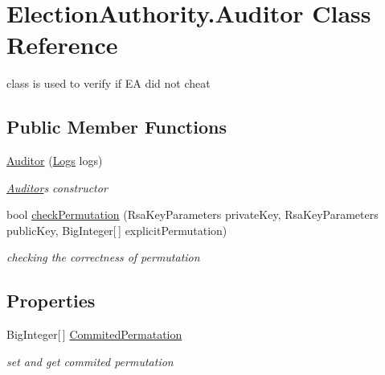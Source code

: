 \hypertarget{class_election_authority_1_1_auditor}{}\section{Election\+Authority.\+Auditor Class Reference}
\label{class_election_authority_1_1_auditor}


class is used to verify if E\+A did not cheat  


\subsection*{Public Member Functions}
\begin{DoxyCompactItemize}
\item 
\hyperlink{class_election_authority_1_1_auditor_ad1edb55058d499d307618a0c5842b12d}{Auditor} (\hyperlink{class_election_authority_1_1_logs}{Logs} logs)
\begin{DoxyCompactList}\small\item\em \hyperlink{class_election_authority_1_1_auditor}{Auditor}\textquotesingle{}s constructor \end{DoxyCompactList}\item 
bool \hyperlink{class_election_authority_1_1_auditor_a6c3c9a569074bd3dcf5d946046a618e4}{check\+Permutation} (Rsa\+Key\+Parameters private\+Key, Rsa\+Key\+Parameters public\+Key, Big\+Integer\mbox{[}$\,$\mbox{]} explicit\+Permutation)
\begin{DoxyCompactList}\small\item\em checking the correctness of permutation \end{DoxyCompactList}\end{DoxyCompactItemize}
\subsection*{Properties}
\begin{DoxyCompactItemize}
\item 
Big\+Integer\mbox{[}$\,$\mbox{]} \hyperlink{class_election_authority_1_1_auditor_a5448d8d3151a043fd123ceba17c2329b}{Commited\+Permatation}
\begin{DoxyCompactList}\small\item\em set and get commited permutation \end{DoxyCompactList}\end{DoxyCompactItemize}


